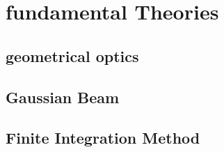 \chapter{fundamental Theories}

\section{geometrical optics}




\section{Gaussian Beam}



\section{Finite Integration Method}


